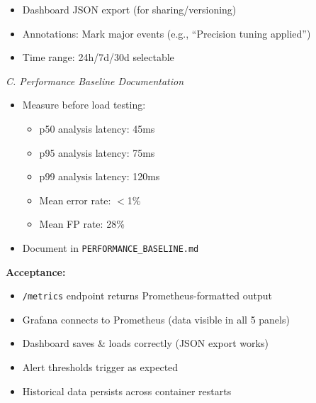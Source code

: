 \documentclass[11pt,a4paper]{article}
\begin{document}
\begin{itemize}[leftmargin=*]
    \textbf{Panel 5: ``Redis Queue Depth''}
    \begin{itemize}
        \item Line chart: jobs waiting in queue
        \item Alert: if depth $>$ 10 jobs, queue is backed up
        \item Shows when system is overwhelmed
        \item Query: \texttt{redis\_queue\_depth}
    \end{itemize}

    \item Dashboard JSON export (for sharing/versioning)
    \item Annotations: Mark major events (e.g., ``Precision tuning applied'')
    \item Time range: 24h/7d/30d selectable
\end{itemize}

\textit{C. Performance Baseline Documentation}
\begin{itemize}[leftmargin=*]
    \item Measure before load testing:
    \begin{itemize}
        \item p50 analysis latency: 45ms
        \item p95 analysis latency: 75ms
        \item p99 analysis latency: 120ms
        \item Mean error rate: $<$1\%
        \item Mean FP rate: 28\%
    \end{itemize}
    \item Document in \texttt{PERFORMANCE\_BASELINE.md}
\end{itemize}

\textbf{Acceptance:}
\begin{itemize}[leftmargin=*]
    \item[$\checkmark$] \texttt{/metrics} endpoint returns Prometheus-formatted output
    \item[$\checkmark$] Grafana connects to Prometheus (data visible in all 5 panels)
    \item[$\checkmark$] Dashboard saves \& loads correctly (JSON export works)
    \item[$\checkmark$] Alert thresholds trigger as expected
    \item[$\checkmark$] Historical data persists across container restarts
\end{itemize}
\end{document}
